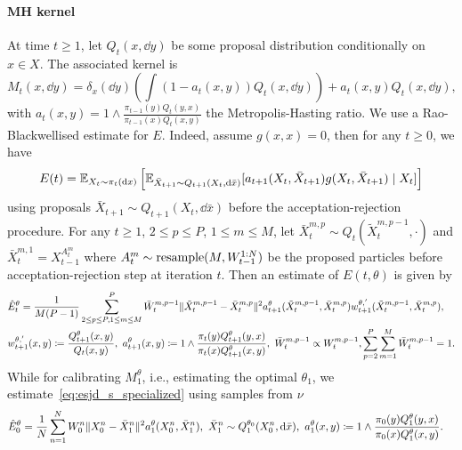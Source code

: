 \paragraph{MH kernel}
At time $t\geq 1$, let $Q_t(x, \dd y)$ be some proposal distribution conditionally on $x\in X$.
The associated kernel is
\begin{equation}
    M_t(x, \dd y) = \delta_x (\dd y) \left(\int (1-a_t(x, y))Q_t(x, \dd y)\right) + a_t(x, y)Q_t(x, \dd y),
\end{equation}
with $a_t(x, y) = 1\wedge \frac{\pi_{t-1}(y)Q_t(y, x)}{\pi_{t-1}(x)Q_t(x, y)}$ the Metropolis-Hasting ratio.
We use a Rao-Blackwellised estimate for $E$.
Indeed, assume $g(x, x) = 0$, then for any $t\geq 0$, we have
\begin{equation}
    \label{eq:esjd_s_specialized}
    E(t) = \mathbb{E}_{X_t\sim \pi_t(\mathrm{d} x)} \left[\mathbb{E}_{\bar{X}_{t+1}\sim Q_{t+1}(X_t, \mathrm{d} \bar{x})}[a_{t+1}(X_t, \bar{X}_{t+1}) g(X_t, \bar{X}_{t+1})\mid X_t]\right]
\end{equation}
using proposals $\bar{X}_{t+1}\sim Q_{t+1}(X_t, \dd \bar{x})$ before the acceptation-rejection procedure.
For any $t\geq 1$,  $2\leq p \leq P$, $1\leq m\leq M$, let $\bar{X}_t^{m, p} \sim Q_t(\tilde{X}_t^{m,p-1}, \cdot)$ and $\bar{X}_t^{m,1} = X_{t-1}^{A_t^m}$ where $A_t^m\sim \textup{resample}(M, W_{t-1}^{1:N})$ be the proposed particles before acceptation-rejection step at iteration $t$.
Then an estimate of $E(t, \theta)$ is given by
\begin{equation}
    \begin{split}
        \label{eq:esjd_estimate}
        &\hat{E}^{\theta}_t = \frac{1}{M(P-1)}\sum_{2\leq p\leq P, 1\leq m\leq M}^{P}\bar{W}_t^{m,p-1}  \lVert\tilde{X}_t^{m,p-1}-\bar{X}_{t}^{m,p}\rVert^2 a_{t+1}^{\theta}(\tilde{X}_t^{m,p-1}, \bar{X}_{t}^{m,p}) w_{t+1}^{\theta,'}(\tilde{X}_t^{m,p-1}, \bar{X}_{t}^{m,p}),\\
        &w_{t+1}^{\theta,'}(x, y) \coloneq \frac{Q_{t+1}^{\theta}(x, y)}{Q_t(x,y)},\,\, a_{t+1}^{\theta}(x,y) \coloneq 1 \wedge \frac{\pi_t(y)Q_{t+1}^{\theta}(y, x)}{\pi_t(x) Q_{t+1}^{\theta}(x, y)},\,\, \bar{W}_t^{m,p-1}\propto W_{t}^{m, p-1}, \sum_{p=2}^{P}\sum_{m=1}^{M}\bar{W}_t^{m,p-1} = 1.
    \end{split}
\end{equation}
While for calibrating $M_{1}^{\theta}$, i.e., estimating the optimal $\theta_1$, we estimate~\eqref{eq:esjd_s_specialized} using samples from $\nu$
\begin{equation}
    \begin{split}
        &\hat{E}^{\theta}_{0} = \frac{1}{N} \sum_{n=1}^{N} W_0^n \lVert X_0^n - \bar{X}_1^n\rVert^2 a_1^{\theta}(X_0^n, \bar{X}_1^n),\,\, \bar{X}_1^n \sim Q_1^{\theta_0}(X_0^n, \mathrm{d} \bar{x}),\,\, a_{1}^{\theta}(x,y) \coloneq 1 \wedge \frac{\pi_0(y)Q_{1}^{\theta}(y, x)}{\pi_0(x) Q_{1}^{\theta}(x, y)}.
    \end{split}
\end{equation}
